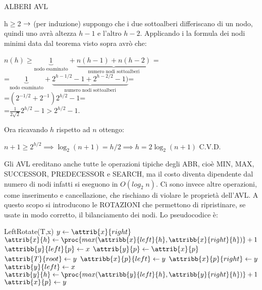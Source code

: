 \documentclass[8pt]{extarticle}
\begin{document}
\begin{formulario}
\begin{myParagraph}{ALBERI AVL}
\begin{Descr}
\begin{Descr}
\begin{Descr}
					\item[h$\bm{\geq}$2] $\rightarrow$ (per induzione) suppongo che i due sottoalberi differiscano di un nodo, quindi uno avrà altezza $h-1$ e l'altro $h-2$. Applicando i la formula dei nodi minimi data dal teorema visto sopra avrò che:
					\begin{tcenter}
					$n(h)\geq \underbrace{1}_\text{nodo esaminato} + \underbrace{n(h-1)+n(h-2)}_\text{numero nodi sottoalberi}$ =\\
					=$\underbrace{1}_\text{nodo esaminato} + \underbrace{2^{h-1/2}-1+2^{h-2/2}-1)}_\text{numero nodi sottoalberi}$=\\
					=$(2^{-1/2}+2^{-1})2^{h/2}-1$=\\=$\frac{1}{2\sqrt{2}}2^{h/2}-1>2^{h/2}-1$.
					\end{tcenter}
					Ora ricavando $h$ rispetto ad $n$ ottengo: 
					\begin{tcenter}
						$n+1\geq2^{h/2}\implies\log_2(n+1)=h/2\implies h=2\log_2(n+1)$ \qquad C.V.D.
					\end{tcenter}
				\end{Descr}
			\end{Descr}
		\end{Descr} 
Gli AVL ereditano anche tutte le operazioni tipiche degli ABR, cioè MIN, MAX, SUCCESSOR, PREDECESSOR e SEARCH, ma il costo diventa dipendente dal numero di nodi infatti si eseguono in $O(log_2 \;n)$. Ci sono invece altre operazioni, come inserimento e cancellazione, che rischiano di violare le proprietà dell'AVL. A questo scopo si introducono le ROTAZIONI che permettono di ripristinare, se usate in modo corretto, il bilanciamento dei nodi. Lo pseudocodice è:
		\begin{code}{LeftRotate(T,x)}
\li $y \get \attrib{x}{right}$ 
\li $\attrib{x}{h}\get \proc{max(\attribb{x}{left}{h},\attribb{x}{right}{h})}+1$
\li {}
	\li $\attribb{y}{left}{p}\get x$ 
\END
\li $\attrib{y}{p}\get\attrib{x}{p}$ 
\li {} \qquad\qquad {}
	\li $\attrib{T}{root}\get y$
\li {} 
	\li $\attribb{x}{p}{left}\get y$
\li \ELSE
	\li $\attribb{x}{p}{right}\get y$
\END
\li $\attrib{y}{left}\get x$ 
\li $\attrib{y}{h}\get\proc{max(\attribb{y}{left}{h},\attribb{y}{right}{h})}+1$
\li $\attrib{x}{p}\get y$ 

\end{code}
\end{myParagraph}
\end{formulario}
\end{document}
